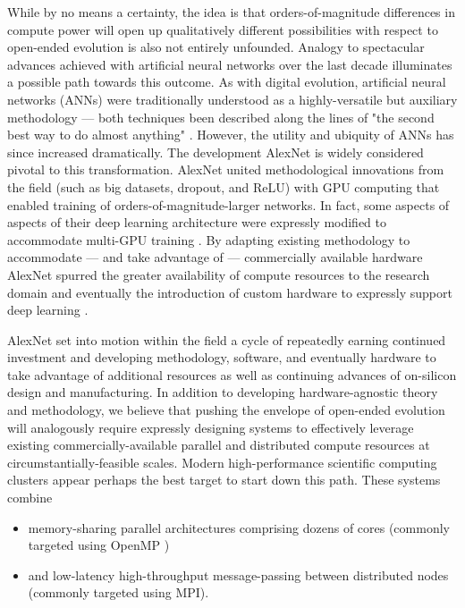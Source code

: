 While by no means a certainty, the idea is that orders-of-magnitude differences in compute power will open up qualitatively different possibilities with respect to open-ended evolution is also not entirely unfounded.
Analogy to spectacular advances achieved with artificial neural networks over the last decade illuminates a possible path towards this outcome.
As with digital evolution, artificial neural networks (ANNs) were traditionally understood as a highly-versatile but auxiliary methodology --- both techniques been described along the lines of "the second best way to do almost anything" \citep{miaoulis2008intelligent, eiben2015introduction}.
However, the utility and ubiquity of ANNs has since increased dramatically.
The development AlexNet is widely considered pivotal to this transformation.
AlexNet united methodological innovations from the field (such as big datasets, dropout, and ReLU) with GPU computing that enabled training of orders-of-magnitude-larger networks.
In fact, some aspects of aspects of their deep learning architecture were expressly modified to accommodate multi-GPU training \citep{krizhevsky2012imagenet}.
By adapting existing methodology to accommodate --- and take advantage of --- commercially available hardware AlexNet spurred the greater availability of compute resources to the research domain and eventually the introduction of custom hardware to expressly support deep learning \citep{jouppi2017datacenter}.

AlexNet set into motion within the field a cycle of repeatedly earning continued investment and developing methodology, software, and eventually hardware to take advantage of additional resources as well as continuing advances of on-silicon design and manufacturing.
In addition to developing hardware-agnostic theory and methodology, we believe that pushing the envelope of open-ended evolution will analogously require expressly designing systems to effectively leverage existing commercially-available parallel and distributed compute resources at circumstantially-feasible scales.
Modern high-performance scientific computing clusters appear perhaps the best target to start down this path.
These systems combine
\begin{itemize}
\item memory-sharing parallel architectures comprising dozens of cores (commonly targeted using OpenMP \citep{dagum1998openmp})
\item and low-latency high-throughput message-passing between distributed nodes (commonly targeted using MPI\citep{clarke1994mpi}).
\end{itemize}

